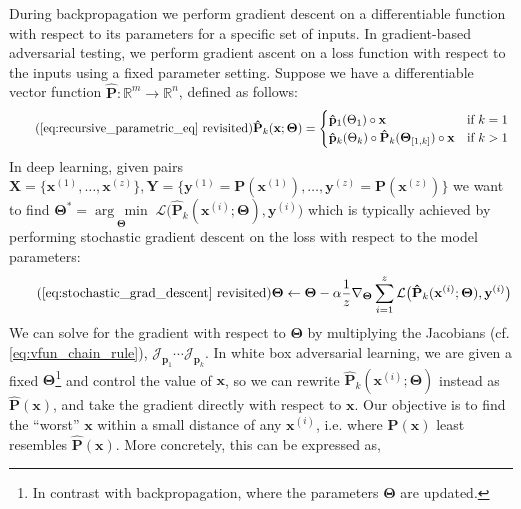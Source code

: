 \documentclass[12pt,initial,twoside,maitrise]{dms}
\newcommand{\argmin}[1]{\underset{#1}{\operatorname{arg}\,\operatorname{min}}\;}
\numberwithin{equation}{section}
\numberwithin{table}{chapter}
\numberwithin{figure}{chapter}
\begin{document}
During backpropagation we perform gradient descent on a differentiable function with respect to its parameters for a specific set of inputs. In gradient-based adversarial testing, we perform gradient ascent on a loss function with respect to the inputs using a fixed parameter setting. Suppose we have a differentiable vector function $\mathbf{\hat P}: \mathbb{R}^m\rightarrow\mathbb{R}^n$, defined as follows:
%
\begin{equation} \tag{\autoref{eq:recursive_parametric_eq} revisited}
    \mathbf{\hat P}_k(\mathbf{x}; \mathbf{\Theta}) = \begin{cases} \mathbf{\hat p}_1(\Theta_1)\circ\mathbf{x} &\text{if } k=1\\ \mathbf{\hat p}_k(\Theta_k)\circ \mathbf{\hat P}_{k}(\mathbf{\Theta}_{[1, k]})\circ\mathbf{x}&\text{if } k > 1 \end{cases} \\
\end{equation}
%
In deep learning, given pairs $\mathbf{X} = \{\mathbf{x}^{(1)}, \dots, \mathbf{x}^{(z)}\}, \mathbf{Y} = \{\mathbf{y}^{(1)} = \mathbf{P}(\mathbf{x}^{(1)}), \dots, \mathbf{y}^{(z)} = \mathbf{P}(\mathbf{x}^{(z)})\}$ we want to find $\mathbf{\Theta}^* = \argmin{\boldsymbol{\Theta}}\mathcal{L}\big(\mathbf{\hat P}_k(\mathbf{x}^{(i)}; \mathbf{\Theta}), \mathbf{y}^{(i)}\big)$ which is typically achieved by performing stochastic gradient descent on the loss with respect to the model parameters:
%
\begin{equation} \tag{\autoref{eq:stochastic_grad_descent} revisited}
    \mathbf\Theta \leftarrow \mathbf\Theta - \alpha\frac{1}{z}\nabla_{\mathbf\Theta} \sum_{i=1}^z\mathcal{L}\big(\mathbf{\hat P}_k(\mathbf{x}^{(i)}; \mathbf{\Theta}), \mathbf{y}^{(i)}\big)
\end{equation}
%
We can solve for the gradient with respect to $\mathbf{\Theta}$ by multiplying the Jacobians (cf. \autoref{eq:vfun_chain_rule}), $\mathcal{J}_{\mathbf{p}_1} \cdots \mathcal{J}_{\mathbf{p}_k}$. In white box adversarial learning, we are given a fixed $\mathbf \Theta$\footnote{In contrast with backpropagation, where the parameters $\mathbf\Theta$ are updated.} and control the value of $\mathbf x$, so we can rewrite $\mathbf{\hat P}_k(\mathbf{x}^{(i)};\mathbf\Theta)$ instead as $\mathbf{\hat P}(\mathbf x)$, and take the gradient directly with respect to $\mathbf x$. Our objective is to find the ``worst'' $\mathbf x$ within a small distance of any $\mathbf x^{(i)}$, i.e. where $\mathbf{P}(\mathbf x)$ least resembles $\mathbf{\hat P}(\mathbf x)$. More concretely, this can be expressed as,
\end{document}
